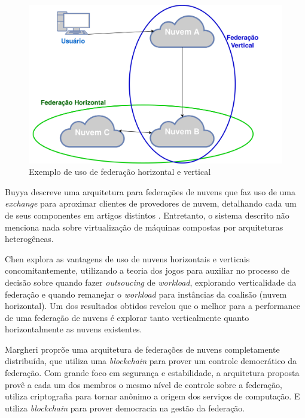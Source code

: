 \begin{figure}[htbp]
	\centerline{\includegraphics[scale=0.032]{img/ExemploFederacao.png}}
	\caption{Exemplo de uso de federação horizontal e vertical}
	\label{ExemploFederacao}
\end{figure}


Buyya \cite{Buyya:2010:IUF:2143583.2143586} descreve uma arquitetura para federações de nuvens que faz uso de uma \textit{exchange} para aproximar clientes de provedores de nuvem, detalhando cada um de seus componentes em artigos distintos \cite{Calheiros:2012:CSE:2263483.2264538} \cite{Garg2013} \cite{4539666} \cite{6063003}. Entretanto, o sistema descrito não menciona nada sobre virtualização de máquinas compostas por arquiteturas heterogêneas.

Chen\cite{7835207} explora as vantagens de uso de nuvens horizontais e verticais concomitantemente, utilizando a teoria dos jogos para auxiliar no processo de decisão sobre quando fazer \textit{outsoucing} de \textit{workload}, explorando verticalidade da federação e quando remanejar o \textit{workload} para instâncias da coalisão (nuvem horizontal). Um dos resultados obtidos revelou que o melhor para a performance de uma federação de nuvens é explorar tanto verticalmente quanto horizontalmente as nuvens existentes.

Margheri \cite{FaaS_8030651} proprõe uma arquitetura de federações de nuvens completamente distribuída, que utiliza uma \textit{blockchain} para prover um controle democrático da federação. Com grande foco em segurança e estabilidade, a arquitetura proposta provê a cada um dos membros o mesmo nível de controle sobre a federação, utiliza criptografia para tornar anônimo a origem dos serviços de computação. E utiliza \textit{blockchain} para prover democracia na gestão da federação.

